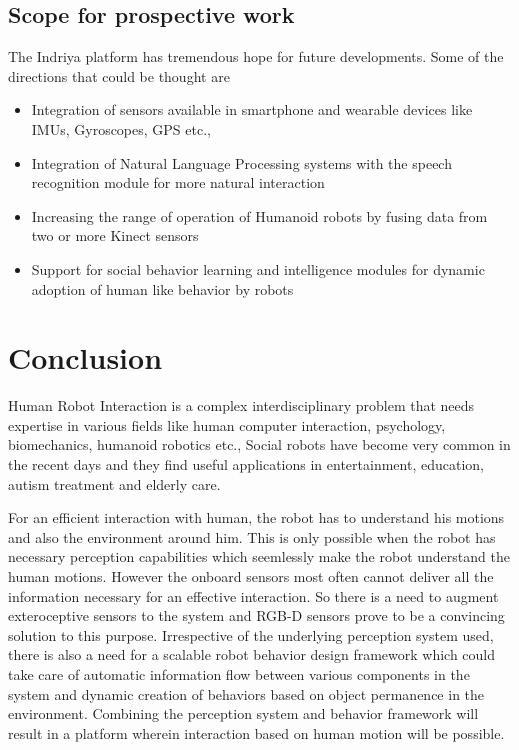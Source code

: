 \subsection{Scope for prospective work}
  The Indriya platform has tremendous hope for future developments. Some of the directions that could be thought are

\begin{itemize}
\item Integration of sensors available in smartphone and wearable devices like IMUs, Gyroscopes, GPS etc.,
\item Integration of Natural Language Processing systems with the speech recognition module for more natural interaction
\item Increasing the range of operation of Humanoid robots by fusing data from two or more Kinect sensors 
\item Support for social behavior learning and intelligence modules for dynamic adoption of human like behavior by robots
\end{itemize}

\section{Conclusion} %
	Human Robot Interaction is a complex interdisciplinary problem that needs expertise in various fields like human computer interaction, psychology, biomechanics, humanoid robotics etc., Social robots have become very common in the recent days and they find useful applications in entertainment, education, autism treatment and elderly care. 
	
	For an efficient interaction with human, the robot has to understand his motions and also the environment around him. This is only possible when the robot has necessary perception capabilities which seemlessly make the robot understand the human motions. However the onboard sensors most often cannot deliver all the information necessary for an effective interaction. So there is a need to augment exteroceptive sensors to the system and RGB-D sensors prove to be a convincing solution to this purpose. Irrespective of the underlying perception system used, there is also a need for a scalable robot behavior design framework which could take care of automatic information flow between various components in the system and dynamic creation of behaviors based on object permanence in the environment. Combining the perception system and behavior framework will result in a platform wherein interaction based on human motion will be possible. 
	
